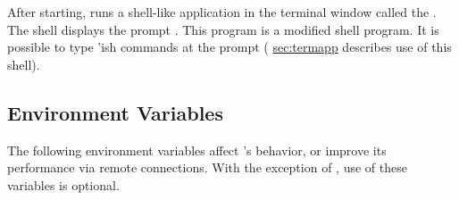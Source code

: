 After starting, \sr{} runs a shell-like application in the
terminal window called the .  The \sr{} shell displays the
prompt .  This program is  a modified  shell program. It is possible to type
'ish \sr{} commands at the prompt ( \hyperref{a later section}{Section~}{}{sec:termapp} describes use of this shell).


\subsection{Environment Variables}
\label{sec:environ} 

\newcommand{\envitem}[1]{\item[\envvar{#1}]\latex{\mbox{}\\}}

The following environment variables affect \sr{}'s behavior, or
improve its performance via remote connections.  With the exception of
, use of these variables is
optional.

